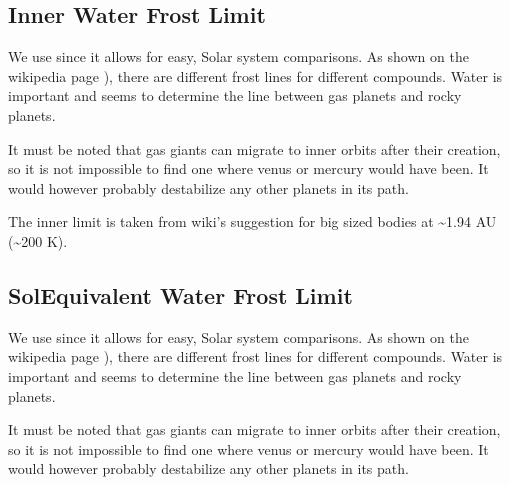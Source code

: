 \documentclass[letterpaper,10pt,english]{sphinxmanual}
\begin{document}
\subsection{Inner Water Frost Limit}
\label{\detokenize{quantities/children_orbit_limits/inner_water_frost_limit:inner-water-frost-limit}}\label{\detokenize{quantities/children_orbit_limits/inner_water_frost_limit::doc}}\label{\detokenize{quantities/children_orbit_limits/inner_water_frost_limit:id1}}
\sphinxAtStartPar
We use {\hyperref[\detokenize{quantities/insolation_models/selsis/selsis:selsis-insolation-model}]{}} since it allows for easy, Solar system comparisons.
As shown on the wikipedia page ), there are different
frost lines for different compounds. Water is important and seems to determine the line between gas planets and
rocky planets.

\sphinxAtStartPar
It must be noted that gas giants can migrate to inner orbits after their creation,
so it is not impossible to find one where venus or mercury would have been. It would however
probably destabilize any other planets in its path.

\sphinxAtStartPar
The inner limit is taken from wiki’s suggestion for big sized bodies at \textasciitilde{}1.94 AU (\textasciitilde{}200 K).


\subsection{Sol\sphinxhyphen{}Equivalent Water Frost Limit}
\label{\detokenize{quantities/children_orbit_limits/sol_equivalent_water_frost_limit:sol-equivalent-water-frost-limit}}\label{\detokenize{quantities/children_orbit_limits/sol_equivalent_water_frost_limit::doc}}\label{\detokenize{quantities/children_orbit_limits/sol_equivalent_water_frost_limit:id1}}
\sphinxAtStartPar
We use {\hyperref[\detokenize{quantities/insolation_models/selsis/selsis:selsis-insolation-model}]{}} since it allows for easy, Solar system comparisons.
As shown on the wikipedia page ), there are different
frost lines for different compounds. Water is important and seems to determine the line between gas planets and
rocky planets.

\sphinxAtStartPar
It must be noted that gas giants can migrate to inner orbits after their creation,
so it is not impossible to find one where venus or mercury would have been. It would however
probably destabilize any other planets in its path.
\end{document}
